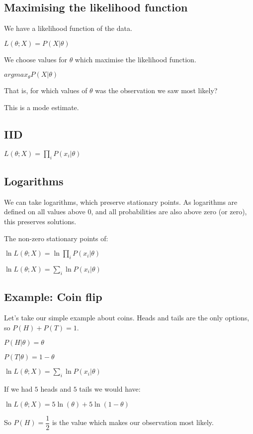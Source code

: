
\subsection{Maximising the likelihood function}

We have a likelihood function of the data.

\(L(\theta ; X)=P(X|\theta )\)

We choose values for \(\theta \) which maximise the likelihood function.

\(argmax_\theta P(X|\theta )\)

That is, for which values  of \(\theta \) was the observation we saw most likely?

This is a mode estimate.

\subsection{IID}

\(L(\theta ; X)=\prod_i P(x_i|\theta )\)

\subsection{Logarithms}

We can take logarithms, which preserve stationary points. As logarithms are defined on all values above \(0\), and all probabilities are also above zero (or zero), this preserves solutions.

The non-zero stationary points of:

\(\ln L(\theta ; X)=\ln \prod_i P(x_i|\theta )\)

\(\ln L(\theta ; X)=\sum_i \ln P(x_i|\theta )\)

\subsection{Example: Coin flip}

Let’s take our simple example about coins. Heads and tails are the only options, so \(P(H)+P(T)=1\). 

\(P(H|\theta )=\theta \)

\(P(T|\theta )=1-\theta \)

\(\ln L(\theta ; X)=\sum_i \ln P(x_i|\theta )\)

If we had \(5\) heads and \(5\) tails we would have:

\(\ln L(\theta ; X)=5\ln (\theta )+ 5\ln (1-\theta )\)

So \(P(H)=\dfrac{1}{2}\) is the value which makes our observation most likely.

